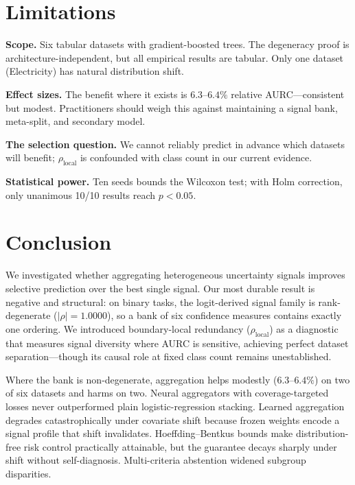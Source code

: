 \documentclass[conference]{IEEEtran}
\newcommand{\rholocal}{\rho_{\mathrm{local}}}
\begin{document}
\section{Limitations}
\label{sec:limitations}

\textbf{Scope.} Six tabular datasets with gradient-boosted trees. The degeneracy proof is architecture-independent, but all empirical results are tabular. Only one dataset (Electricity) has natural distribution shift.

\textbf{Effect sizes.} The benefit where it exists is $6.3$--$6.4\%$ relative AURC---consistent but modest. Practitioners should weigh this against maintaining a signal bank, meta-split, and secondary model.

\textbf{The selection question.} We cannot reliably predict in advance which datasets will benefit; $\rholocal$ is confounded with class count in our current evidence.

\textbf{Statistical power.} Ten seeds bounds the Wilcoxon test; with Holm correction, only unanimous 10/10 results reach $p{<}0.05$.

\section{Conclusion}
\label{sec:conclusion}

We investigated whether aggregating heterogeneous uncertainty signals improves selective prediction over the best single signal. Our most durable result is negative and structural: on binary tasks, the logit-derived signal family is rank-degenerate ($|\rho|{=}1.0000$), so a bank of six confidence measures contains exactly one ordering. We introduced boundary-local redundancy ($\rholocal$) as a diagnostic that measures signal diversity where AURC is sensitive, achieving perfect dataset separation---though its causal role at fixed class count remains unestablished.

Where the bank is non-degenerate, aggregation helps modestly ($6.3$--$6.4\%$) on two of six datasets and harms on two. Neural aggregators with coverage-targeted losses never outperformed plain logistic-regression stacking. Learned aggregation degrades catastrophically under covariate shift because frozen weights encode a signal profile that shift invalidates. Hoeffding--Bentkus bounds make distribution-free risk control practically attainable, but the guarantee decays sharply under shift without self-diagnosis. Multi-criteria abstention widened subgroup disparities.
\end{document}
